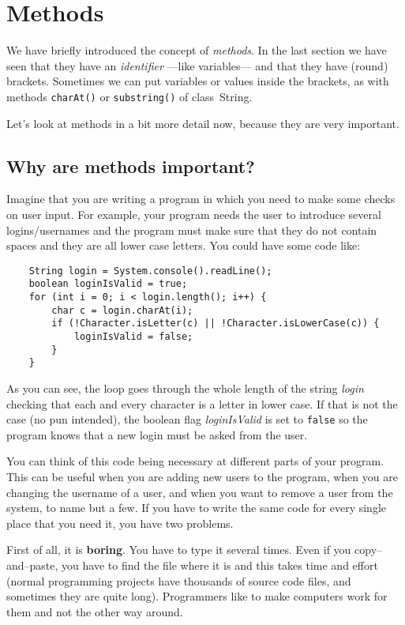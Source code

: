 
\section{Methods}
\label{sec:methods}

We have briefly introduced the concept of
\emph{methods}. In the last section we have seen that they have an
\emph{identifier} ---like variables--- and that they have (round)
brackets. Sometimes we can put variables or values inside the
brackets, as with methods \verb+charAt()+ or \verb+substring()+ of
class~String. 

Let's look at methods in a bit more detail now, because they are very
important. 

\subsection{Why are methods important?}

Imagine that you are writing a program in which you need to make some
checks on user input. For example, your program needs the user to
introduce several logins/usernames and the program must make sure that
they do not contain spaces and they are all lower case letters. You
could have some code like:

\begin{verbatim}
    String login = System.console().readLine();
    boolean loginIsValid = true;
    for (int i = 0; i < login.length(); i++) {
        char c = login.charAt(i);
        if (!Character.isLetter(c) || !Character.isLowerCase(c)) {
            loginIsValid = false;
        }
    }
\end{verbatim}

As you can see, the loop goes through the whole length of the string
\emph{login} checking that each and every character is a letter in
lower case. If that is not the case (no pun intended), the boolean flag
\emph{loginIsValid} is set to \verb+false+ so the program knows that a
new login must be asked from the user.

You can think of this code being necessary at different parts of
your program. This can be useful when you are adding new users to the
program, when you are changing the username of a user, and when
you want to remove a user from the system, to name but a few. If you
have to write the same code for every single place that you need it,
you have two problems.

First of all, it is \textbf{boring}. You have to type it several
times. Even if you copy--and--paste, you have to find the file where
it is and this takes time and effort 
(normal programming projects have thousands of source
code files, and sometimes they are quite long). Programmers like to
make computers work for them and not the other way around.


